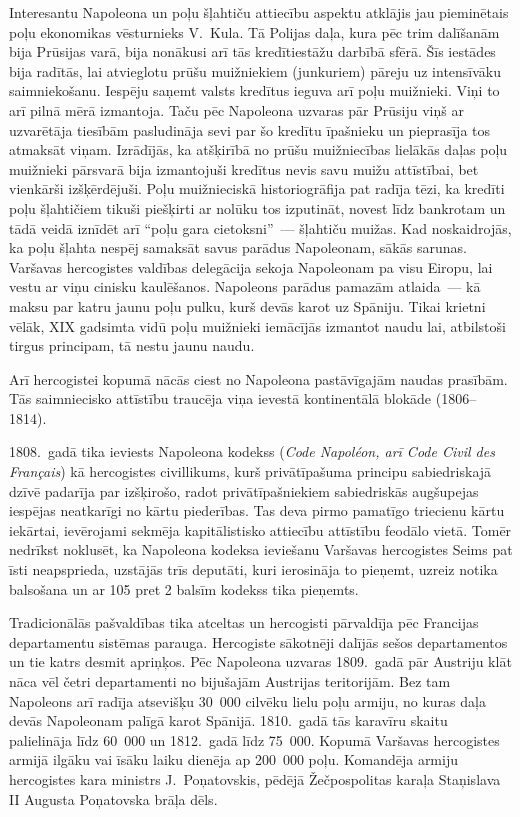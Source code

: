 \documentclass[twoside,a5paper,12pt,fleqn,openany]{extbook}
\newcommand{\frtxti}[1]{\textit{\textfrench{#1}}}
\begin{document}
Interesantu Napoleona un poļu šļahtiču attiecību aspektu atklājis jau pieminētais poļu ekonomikas vēsturnieks V.~Kula. Tā Polijas daļa, kura pēc trim dalīšanām bija Prūsijas varā, bija nonākusi arī tās kredītiestāžu darbībā sfērā. Šīs iestādes bija radītās, lai atvieglotu prūšu muižniekiem (junkuriem) pāreju uz intensīvāku saimniekošanu. Iespēju saņemt valsts kredītus ieguva arī poļu muižnieki. Viņi to arī pilnā mērā izmantoja. Taču pēc Napoleona uzvaras pār Prūsiju viņš ar uzvarētāja tiesībām pasludināja sevi par šo kredītu īpašnieku un pieprasīja tos atmaksāt viņam. Izrādījās, ka atšķirībā no prūšu muižniecības lielākās daļas poļu muižnieki pārsvarā bija izmantojuši kredītus nevis savu muižu attīstībai, bet vienkārši izšķērdējuši. Poļu muižnieciskā historiogrāfija pat radīja tēzi, ka kredīti poļu šļahtičiem tikuši piešķirti ar nolūku tos izputināt, novest līdz bankrotam un tādā veidā iznīdēt arī ``poļu gara cietoksni''~--- šļahtiču muižas. Kad noskaidrojās, ka poļu šļahta nespēj samaksāt savus parādus Napoleonam, sākās sarunas. Varšavas hercogistes valdības delegācija sekoja Napoleonam pa visu Eiropu, lai vestu ar viņu cinisku kaulēšanos. Napoleons parādus pamazām atlaida~--- kā maksu par katru jaunu poļu pulku, kurš devās karot uz Spāniju. Tikai krietni vēlāk, XIX gadsimta vidū poļu muižnieki iemācījās izmantot naudu lai, atbilstoši tirgus principam, tā nestu jaunu naudu.

Arī hercogistei kopumā nācās ciest no Napoleona pastāvīgajām naudas prasībām. Tās saimniecisko attīstību traucēja viņa ievestā kontinentālā blokāde (1806--1814).

1808.~gadā tika ieviests Napoleona kodekss (\frtxti{Code Napoléon, arī Code Civil des Français}) kā hercogistes civillikums, kurš privātīpašuma principu sabiedriskajā dzīvē padarīja par izšķirošo, radot privātīpašniekiem sabiedriskās augšupejas iespējas neatkarīgi no kārtu piederības. Tas deva pirmo pamatīgo triecienu kārtu iekārtai, ievērojami sekmēja kapitālistisko attiecību attīstību feodālo vietā. Tomēr nedrīkst noklusēt, ka Napoleona kodeksa ieviešanu Varšavas hercogistes Seims pat īsti neapsprieda, uzstājās trīs deputāti, kuri ierosināja to pieņemt, uzreiz notika balsošana un ar 105 pret 2 balsīm kodekss tika pieņemts.

Tradicionālās pašvaldības tika atceltas un hercogisti pārvaldīja pēc Francijas departamentu sistēmas parauga. Hercogiste sākotnēji dalījās sešos departamentos un tie katrs desmit apriņķos. Pēc Napoleona uzvaras 1809.~gadā pār Austriju klāt nāca vēl četri departamenti no bijušajām Austrijas teritorijām. Bez tam Napoleons arī radīja atsevišķu 30~000 cilvēku lielu poļu armiju, no kuras daļa devās Napoleonam palīgā karot Spānijā. 1810.~gadā tās karavīru skaitu palielināja līdz 60~000 un 1812.~gadā līdz 75~000. Kopumā Varšavas hercogistes armijā ilgāku vai īsāku laiku dienēja ap 200~000 poļu. Komandēja armiju hercogistes kara ministrs J.~Poņatovskis, pēdējā Žečpospolitas karaļa Staņislava II Augusta Poņatovska brāļa dēls.
\end{document}
